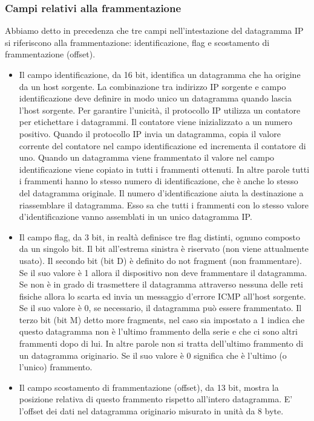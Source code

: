 \subsubsection{Campi relativi alla frammentazione}
Abbiamo detto in precedenza che tre campi nell'intestazione del datagramma IP si riferiscono alla frammentazione: identificazione, flag e scostamento di frammentazione (offset).
\begin{itemize}
    \item Il campo identificazione, da 16 bit, identifica un datagramma che ha origine da un host sorgente. La combinazione tra indirizzo IP sorgente e campo identificazione deve definire in modo unico un datagramma quando lascia l'host sorgente. Per garantire l'unicità, il protocollo IP utilizza un contatore per etichettare i datagrammi. Il contatore viene inizializzato a un numero positivo. Quando il protocollo IP invia un datagramma, copia il valore corrente del contatore nel campo identificazione ed incrementa il contatore di uno. Quando un datagramma viene frammentato il valore nel campo identificazione viene copiato in tutti i frammenti ottenuti. In altre parole tutti i frammenti hanno lo stesso numero di identificazione, che è anche lo stesso del datagramma originale. Il numero d'identificazione aiuta la destinazione a riassemblare il datagramma. Esso sa che tutti i frammenti con lo stesso valore d'identificazione vanno assemblati in un unico datagramma IP.
    \item Il campo flag, da 3 bit, in realtà definisce tre flag distinti, ognuno composto da un singolo bit. Il bit all'estrema sinistra è riservato (non viene attualmente usato). Il secondo bit (bit D) è definito do not fragment (non frammentare). Se il suo valore è 1 allora il dispositivo non deve frammentare il datagramma. Se non è in grado di trasmettere il datagramma attraverso nessuna delle reti fisiche allora lo scarta ed invia un messaggio d'errore ICMP all'host sorgente. Se il suo valore è 0, se necessario, il datagramma può essere frammentato. Il terzo bit (bit M) detto more fragments, nel caso sia impostato a 1 indica che questo datagramma non è l'ultimo frammento della serie e che ci sono altri frammenti dopo di lui. In altre parole non si tratta dell'ultimo frammento di un datagramma originario. Se il suo valore è 0 significa che è l'ultimo (o l'unico) frammento.
    \item Il campo scostamento di frammentazione (offset), da 13 bit, mostra la posizione relativa di questo frammento rispetto all'intero datagramma. E' l'offset dei dati nel datagramma originario misurato in unità da 8 byte.


\end{itemize}
